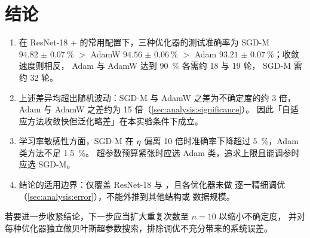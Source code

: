\section{结论}
\label{sec:conclusion}

\begin{enumerate}
  \item 在 ResNet-18 + \dataset{} 的常用配置下，三种优化器的测试准确率为
        SGD-M $\qty{94.82(7)}{\percent}$ $>$ AdamW $\qty{94.56(6)}{\percent}$
        $>$ Adam $\qty{93.21(7)}{\percent}$；收敛速度则相反，
        Adam 与 AdamW 达到 \qty{90}{\percent} 各需约 18 与 19 轮，
        SGD-M 需约 32 轮。

  \item 上述差异均超出随机波动：SGD-M 与 AdamW 之差为不确定度的约 3 倍，
        Adam 与 AdamW 之差约为 15 倍（\cref{sec:analysis:significance}）。
        因此「自适应方法收敛快但泛化略差」在本实验条件下成立。

  \item 学习率敏感性方面，SGD-M 在 $\eta$ 偏离 10 倍时准确率下降超过
        \qty{5}{\percent}，Adam 类方法不足 \qty{1.5}{\percent}。
        超参数预算紧张时应选 Adam 类，追求上限且能调参时应选 SGD-M。

  \item 结论的适用边界：仅覆盖 ResNet-18 与 \dataset{}，且各优化器未做
        逐一精细调优（\cref{sec:analysis:error}），不能外推到其他结构或
        数据规模。
\end{enumerate}

若要进一步收紧结论，下一步应当扩大重复次数至 $n = 10$ 以缩小不确定度，
并对每种优化器独立做贝叶斯超参数搜索，排除调优不充分带来的系统误差。
